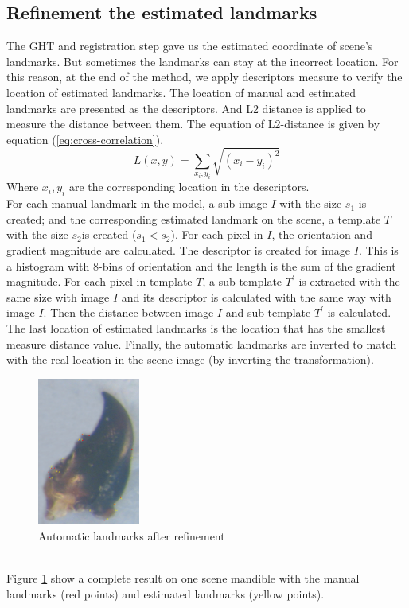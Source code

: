 \documentclass[twoside,twocolumn,10pt]{article}
\begin{document}
\subsection{Refinement the estimated landmarks}
The GHT and registration step gave us the estimated coordinate of scene's landmarks. But sometimes the landmarks can stay at the incorrect location. For this reason, at the end of the method, we apply descriptors measure\cite{sift} to verify the location of estimated landmarks. The location of manual and estimated landmarks are presented as the descriptors. And L2 distance is applied to measure the distance between them. The equation of L2-distance is given by equation (\ref{eq:cross-correlation}).
\begin{equation}
\label{eq:cross-correlation}
	L(x,y) = \sum\limits_{x_i,y_i}\sqrt{(x_i-y_i)^2}
\end{equation}
Where $x_i, y_i $ are the corresponding location in the descriptors.\\[0.2cm]
For each manual landmark in the model, a sub-image \textit{$I$} with the size \textit{$s_1$} is created; and the corresponding estimated landmark on the scene, a template \textit{$T$} with the size \textit{$s_2$}is created (\textit{$s_1 < s_2$}). For each pixel in \textit{$I$}, the orientation and gradient magnitude are calculated. The descriptor is created for image \textit{$I$}. This is a histogram with 8-bins of orientation and the length is the sum of the gradient magnitude. For each pixel in template \textit{$T$}, a sub-template \textit{$T^{'}$} is extracted with the same size with image \textit{$I$} and its descriptor is calculated with the same way with image \textit{$I$}. Then the distance between image \textit{$I$} and sub-template \textit{$T^{'}$} is calculated. The last location of estimated landmarks is the location that has the smallest measure distance value. Finally, the automatic landmarks are inverted to match with the real location in the scene image (by inverting the transformation).
\begin{figure}[htb]
    \centering
    \includegraphics[width=0.3\textwidth]{./images/result}
    \caption{Automatic landmarks after refinement}
    \label{figresult}
\end{figure}~\\
Figure \ref{figresult} show a complete result on one scene mandible with the manual landmarks (red points) and estimated landmarks (yellow points).
\end{document}
